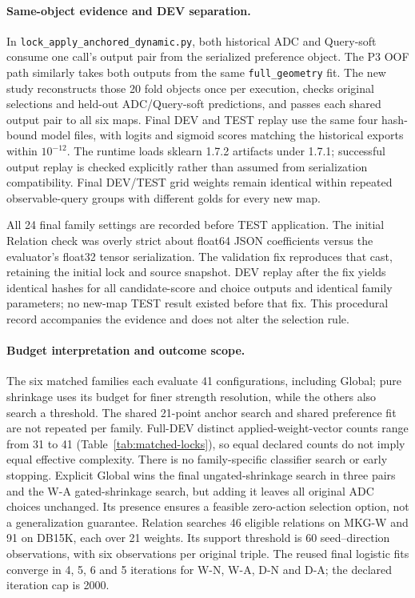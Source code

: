 \documentclass[11pt,a4paper]{article}
\begin{document}
\paragraph{Same-object evidence and DEV separation.}
In \texttt{lock\_apply\_anchored\_dynamic.py}, both historical ADC and Query-soft consume one call's output pair from the serialized preference object. The P3 OOF path similarly takes both outputs from the same \texttt{full\_geometry} fit. The new study reconstructs those 20 fold objects once per execution, checks original selections and held-out ADC/Query-soft predictions, and passes each shared output pair to all six maps. Final DEV and TEST replay use the same four hash-bound model files, with logits and sigmoid scores matching the historical exports within $10^{-12}$. The runtime loads sklearn 1.7.2 artifacts under 1.7.1; successful output replay is checked explicitly rather than assumed from serialization compatibility. Final DEV/TEST grid weights remain identical within repeated observable-query groups with different golds for every new map.

All 24 final family settings are recorded before TEST application. The initial Relation check was overly strict about float64 JSON coefficients versus the evaluator's float32 tensor serialization. The validation fix reproduces that cast, retaining the initial lock and source snapshot. DEV replay after the fix yields identical hashes for all candidate-score and choice outputs and identical family parameters; no new-map TEST result existed before that fix. This procedural record accompanies the evidence and does not alter the selection rule.




\FloatBarrier

\paragraph{Budget interpretation and outcome scope.}
The six matched families each evaluate 41 configurations, including Global; pure shrinkage uses its budget for finer strength resolution, while the others also search a threshold. The shared 21-point anchor search and shared preference fit are not repeated per family. Full-DEV distinct applied-weight-vector counts range from 31 to 41 (Table~\ref{tab:matched-locks}), so equal declared counts do not imply equal effective complexity. There is no family-specific classifier search or early stopping. Explicit Global wins the final ungated-shrinkage search in three pairs and the W-A gated-shrinkage search, but adding it leaves all original ADC choices unchanged. Its presence ensures a feasible zero-action selection option, not a generalization guarantee.
Relation searches 46 eligible relations on MKG-W and 91 on DB15K, each over 21 weights. Its support threshold is 60 seed--direction observations, with six observations per original triple. The reused final logistic fits converge in 4, 5, 6 and 5 iterations for W-N, W-A, D-N and D-A; the declared iteration cap is 2000.
\end{document}
